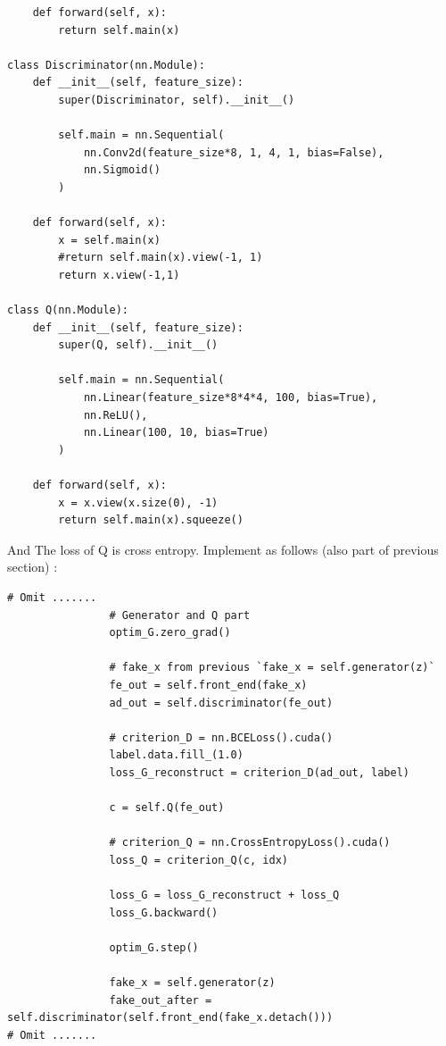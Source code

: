 \documentclass[12pt]{article}
\begin{document}
\begin{verbatim}
    def forward(self, x):
        return self.main(x)
    
class Discriminator(nn.Module):
    def __init__(self, feature_size):
        super(Discriminator, self).__init__()
        
        self.main = nn.Sequential(
            nn.Conv2d(feature_size*8, 1, 4, 1, bias=False),
            nn.Sigmoid()
        )
        
    def forward(self, x):
        x = self.main(x)
        #return self.main(x).view(-1, 1)
        return x.view(-1,1)
    
class Q(nn.Module):
    def __init__(self, feature_size):
        super(Q, self).__init__()
        
        self.main = nn.Sequential(
            nn.Linear(feature_size*8*4*4, 100, bias=True),
            nn.ReLU(),
            nn.Linear(100, 10, bias=True)
        )
        
    def forward(self, x):
        x = x.view(x.size(0), -1)
        return self.main(x).squeeze()
\end{verbatim}

And The loss of Q is cross entropy. Implement as follows (also part of previous section) :

\begin{verbatim}
# Omit .......
                # Generator and Q part
                optim_G.zero_grad()
                
                # fake_x from previous `fake_x = self.generator(z)`
                fe_out = self.front_end(fake_x)
                ad_out = self.discriminator(fe_out)
                
                # criterion_D = nn.BCELoss().cuda()
                label.data.fill_(1.0)
                loss_G_reconstruct = criterion_D(ad_out, label)
                
                c = self.Q(fe_out)
                
                # criterion_Q = nn.CrossEntropyLoss().cuda()
                loss_Q = criterion_Q(c, idx)
                
                loss_G = loss_G_reconstruct + loss_Q
                loss_G.backward()
                
                optim_G.step()
                
                fake_x = self.generator(z)
                fake_out_after = self.discriminator(self.front_end(fake_x.detach()))
# Omit .......
\end{verbatim}
\end{document}
